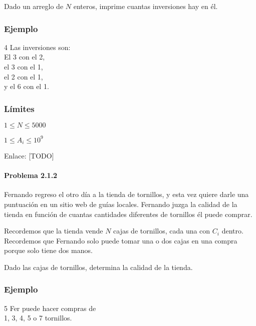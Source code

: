 Dado un arreglo de \(N\) enteros, imprime cuantas inversiones hay en él.

\subsubsection*{Ejemplo}
\begin{casebox3}
	{4}
	{
		Las inversiones son: \\
		El 3 con el 2, \\
		el 3 con el 1,\\
		el 2 con el 1, \\
		y el 6 con el 1. 
	}	
\end{casebox3}
\subsubsection*{Límites}
\begin{plimits}
	\item \(1\leq N \leq 5000\)
	\item \(1\leq A_i \leq 10^9\)
\end{plimits}

Enlace: [TODO]

\problembreak

\paragraph{Problema 2.1.2} Fernando regreso el otro día a la tienda de tornillos, y esta vez quiere darle una puntuación en un sitio web de guías locales. Fernando juzga la calidad de la tienda en función de cuantas cantidades diferentes de tornillos él puede comprar.

Recordemos que la tienda vende \(N\) cajas de tornillos, cada una con \(C_i\) dentro. Recordemos que Fernando solo puede tomar una o dos cajas en una compra porque solo tiene dos manos.

Dado las cajas de tornillos, determina la calidad de la tienda.

\subsubsection{Ejemplo}
\begin{casebox3}
	{5}
	{
	   Fer puede hacer compras de \\
	   1, 3, 4, 5 o 7 tornillos.
	}
\end{casebox3}

